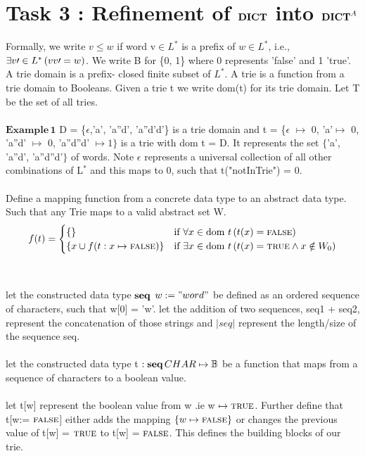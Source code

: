 \documentclass[a4paper,10pt,fleqn]{scrartcl}   	%
\newcommand{\seq}{\pPkey{seq}}
\newcommand{\DICT}{\pPkey{DICT}}
\begin{document}
\section{Task 3 : Refinement of $\DICT$ into $\DICT^{A}$}
Formally, we write $v\leq w$ if word v$\in L^{*}$ is a prefix of $w\in L^{*}$, i.e., $\exists v \prime \in L^{*}\left(vv\prime =w\right)$. We write B for \{0, 1\} where 0 represents 'false' and 1 'true'. A trie domain is a prefix- closed finite subset of $L^{*}$. A trie is a function from a trie domain to Booleans. Given a trie t we write dom(t) for its trie domain. Let T be the set of all tries.
\\ \\
$\mathbf{Example \, 1}$ D = \{$\epsilon$,'a', 'a''d', 'a''d'd'\} is a trie domain and t = \{$\epsilon$ $\mapsto$ 0, 'a'$\mapsto$ 0,  'a''d' $\mapsto$ 0, 'a''d''d' $\mapsto 1\}$ is a trie with dom t = D. It represents the set $\{$'a', 'a''d', 'a''d''d'$\}$ of words. Note $\epsilon$ represents a universal collection of all other combinations of L$^*$ and this maps to 0, such that t("notInTrie") = 0. \\ \\
Define a mapping function from a concrete data type to an abstract data type. Such that any Trie maps to a valid abstract set W. \\
\[ 
f(t) =
 \begin{cases} 
      \{ \}         & \text{if } \forall x\in \text{dom } t\left(t(x) = \text{\textsc{false}}\right) \\
      \{ x \cup f(t: x\mapsto \text{\textsc{false}}) \}    & \text{if } \exists x\in \text{dom } t\left(t(x) = \text{\textsc{true}} \wedge x\notin W_0\right)\\
   \end{cases}
\]
\\ \\
let the constructed data type $\seq$ $w \mathrel{:=} "word"$ be defined as an ordered sequence of characters, such that w[0] = 'w'. let the addition of two sequences, seq1 + seq2, represent the concatenation of those strings and $|seq|$ represent the length/size of the sequence seq. 
\\ \\ 
let the constructed data type t $: \seq \, CHAR \mapsto \bool$ be a function that maps from a sequence of characters to a boolean value. \\ \\
let t[w] represent the boolean value from w .ie w $\mapsto \text{\textsc{true}}$. Further define that t[w:= $\text{\textsc{false}}$] either adds the mapping $\{w\mapsto \text{\textsc{false}}\}$ or changes the previous value of t[w] = $\text{\textsc{true}}$ to t[w] = $\text{\textsc{false}}$. This defines the building blocks of our trie. 
\end{document}
